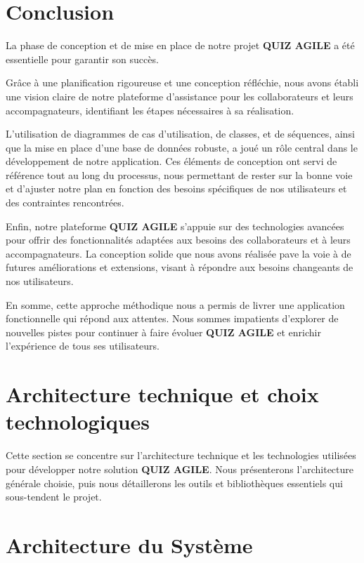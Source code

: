 \documentclass[12pt,a4paper]{report}
\begin{document}
\section{Conclusion}

La phase de conception et de mise en place de notre projet \textbf{QUIZ AGILE} a été essentielle pour garantir son succès.

Grâce à une planification rigoureuse et une conception réfléchie, nous avons établi une vision claire de notre plateforme d'assistance pour les collaborateurs et leurs accompagnateurs, identifiant les étapes nécessaires à sa réalisation.

L'utilisation de diagrammes de cas d'utilisation, de classes, et de séquences, ainsi que la mise en place d'une base de données robuste, a joué un rôle central dans le développement de notre application. Ces éléments de conception ont servi de référence tout au long du processus, nous permettant de rester sur la bonne voie et d'ajuster notre plan en fonction des besoins spécifiques de nos utilisateurs et des contraintes rencontrées.

Enfin, notre plateforme \textbf{QUIZ AGILE} s'appuie sur des technologies avancées pour offrir des fonctionnalités adaptées aux besoins des collaborateurs et à leurs accompagnateurs. La conception solide que nous avons réalisée pave la voie à de futures améliorations et extensions, visant à répondre aux besoins changeants de nos utilisateurs.

En somme, cette approche méthodique nous a permis de livrer une application fonctionnelle qui répond aux attentes. Nous sommes impatients d'explorer de nouvelles pistes pour continuer à faire évoluer \textbf{QUIZ AGILE} et enrichir l'expérience de tous ses utilisateurs.

\section{Architecture technique et choix technologiques}

Cette section se concentre sur l'architecture technique et les technologies utilisées pour développer notre solution \textbf{QUIZ AGILE}. Nous présenterons l'architecture générale choisie, puis nous détaillerons les outils et bibliothèques essentiels qui sous-tendent le projet.

\section{Architecture du Système}
\end{document}
